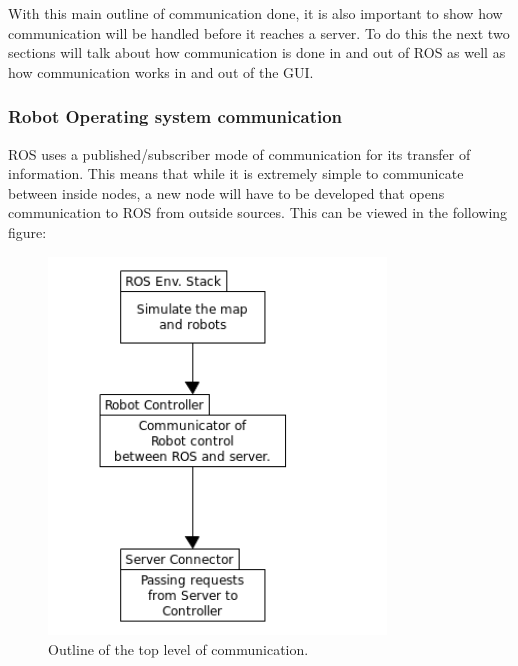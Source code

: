       With this main outline of communication done, it is also important to show how communication will be handled before it reaches a server. To do this the next two sections will talk about how communication is done in and out of ROS as well as how communication works in and out of the GUI.

      \subsubsection{Robot Operating system communication}
        ROS uses a published/subscriber\cite{publisher} mode of communication for its transfer of information. This means that while it is extremely simple to communicate between inside nodes, a new node will have to be developed that opens communication to ROS from outside sources. This can be viewed in the following figure:

          \begin{figure}[!ht]  
            \centering
              \includegraphics[width=0.8\textwidth]{figures/RosCommunication.png}
              \caption{Outline of the top level of communication.}
          \end{figure}

